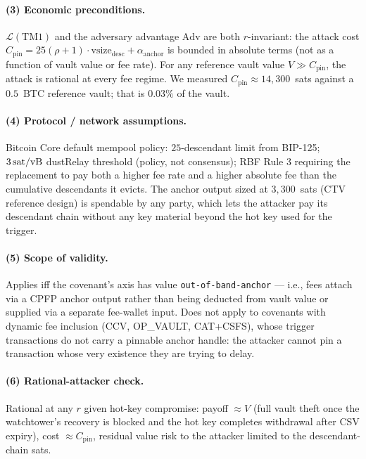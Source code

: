 \paragraph{(3) Economic preconditions.}
$\mathcal{L}(\mathrm{TM1})$ and the adversary advantage $\mathrm{Adv}$
are both $r$-invariant: the attack cost $C_{\text{pin}} = 25(\rho+1)
\cdot \text{vsize}_{\text{desc}} + \alpha_{\text{anchor}}$ is bounded
in absolute terms (not as a function of vault value or fee rate).
For any reference vault value $V \gg C_{\text{pin}}$, the attack is
rational at every fee regime. We measured $C_{\text{pin}} \approx
14{,}300$~sats against a $0.5$~BTC reference vault; that is $0.03\%$
of the vault.

\paragraph{(4) Protocol / network assumptions.}
Bitcoin Core default mempool policy: $25$-descendant limit from
BIP-125; $3\,\text{sat/vB}{}$ dustRelay threshold (policy, not consensus);
RBF Rule 3 requiring the replacement to pay both a higher fee rate
and a higher absolute fee than the cumulative descendants it evicts.
The anchor output sized at $3{,}300$~sats (CTV reference design) is
spendable by any party, which lets the attacker pay its descendant
chain without any key material beyond the hot key used for the
trigger.

\paragraph{(5) Scope of validity.}
Applies iff the covenant's axis \axfee{} has value
\texttt{out-of-band-anchor} --- i.e., fees attach via a CPFP anchor
output rather than being deducted from vault value or supplied via a
separate fee-wallet input. Does not apply to covenants with dynamic
fee inclusion (CCV, OP\_VAULT, CAT+CSFS), whose trigger transactions
do not carry a pinnable anchor handle: the attacker cannot pin a
transaction whose very existence they are trying to delay.

\paragraph{(6) Rational-attacker check.}
Rational at any $r$ given hot-key compromise: payoff $\approx V$
(full vault theft once the watchtower's recovery is blocked and
the hot key completes withdrawal after CSV expiry), cost $\approx
C_{\text{pin}}$, residual value risk to the attacker limited to the
descendant-chain sats.

